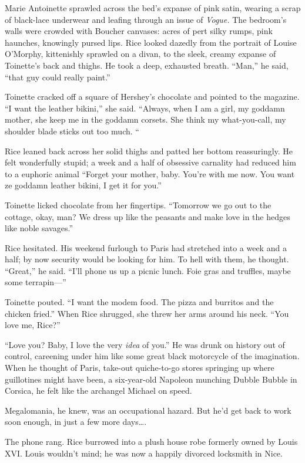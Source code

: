 Marie Antoinette sprawled across the bed's expanse of pink satin, wearing a scrap of black-lace underwear and leafing through an issue of \textit{Vogue.} The bedroom's walls were crowded with Boucher canvases: acres of pert silky rumps, pink haunches, knowingly pursed lips. Rice looked dazedly from the portrait of Louise O'Morphy, kittenishly sprawled on a divan, to the sleek, creamy expanse of Toinette's back and thighs. He took a deep, exhausted breath. ``Man,'' he said, ``that guy could really paint.''

Toinette cracked off a square of Hershey's chocolate and pointed to the magazine. ``I want the leather bikini,'' she said. ``Always, when I am a girl, my goddamn mother, she keep me in the goddamn corsets. She think my what-you-call, my shoulder blade sticks out too much. ``

Rice leaned back across her solid thighs and patted her bottom reassuringly. He felt wonderfully stupid; a week and a half of obsessive carnality had reduced him to a euphoric animal ``Forget your mother, baby. You're with me now. You want ze goddamn leather bikini, I get it for you.''

Toinette licked chocolate from her fingertips. ``Tomorrow we go out to the cottage, okay, man? We dress up like the peasants and make love in the hedges like noble savages.''

Rice hesitated. His weekend furlough to Paris had stretched into a week and a half; by now security would be looking for him. To hell with them, he thought. ``Great,'' he said. ``I'll phone us up a picnic lunch. Foie gras and truffles, maybe some terrapin—''

Toinette pouted. ``I want the modem food. The pizza and burritos and the chicken fried.'' When Rice shrugged, she threw her arms around his neck. ``You love me, Rice?''

``Love you? Baby, I love the very \textit{idea} of you.'' He was drunk on history out of control, careening under him like some great black motorcycle of the imagination. When he thought of Paris, take-out quiche-to-go stores springing up where guillotines might have been, a six-year-old Napoleon munching Dubble Bubble in Corsica, he felt like the archangel Michael on speed.

Megalomania, he knew, was an occupational hazard. But he'd get back to work soon enough, in just a few more days\ldots.

The phone rang. Rice burrowed into a plush house robe formerly owned by Louis XVI. Louis wouldn't mind; he was now a happily divorced locksmith in Nice.

